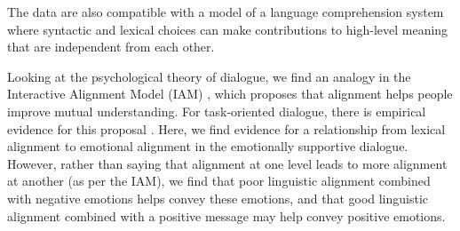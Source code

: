\documentclass[man,biblatex,floatsintext]{apa6}
\begin{document}
The data are also
compatible with a model of a language comprehension system where syntactic and lexical choices can make contributions to high-level meaning that are independent from each other.  


Looking at the psychological theory of dialogue, we find an analogy in the Interactive Alignment Model (IAM) \parencite{pickering2004toward}, which proposes that alignment helps people improve mutual understanding.  For task-oriented dialogue, there is empirical evidence for this proposal \parencite{reitter2014,xu2017acl}.  Here, we find evidence for a relationship from lexical alignment to emotional alignment in the emotionally supportive dialogue.  However, rather than saying that alignment at one level leads to more alignment at another (as per the IAM), we find that poor linguistic alignment combined with negative emotions helps convey these emotions, and that good linguistic alignment combined with a positive message may help convey positive emotions.  


 

\end{document}
